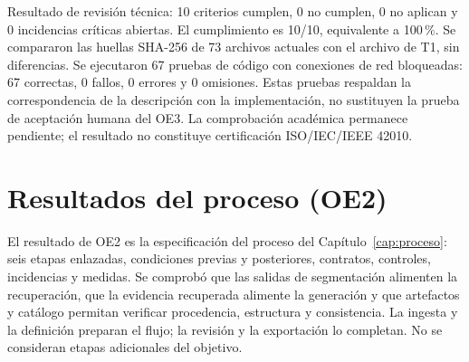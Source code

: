 Resultado de revisión técnica: 10 criterios cumplen, 0 no cumplen, 0 no aplican y 0 incidencias críticas abiertas. El cumplimiento es 10/10, equivalente a 100\,\%. Se compararon las huellas SHA-256 de 73 archivos actuales con el archivo de T1, sin diferencias. Se ejecutaron 67 pruebas de código con conexiones de red bloqueadas: 67 correctas, 0 fallos, 0 errores y 0 omisiones. Estas pruebas respaldan la correspondencia de la descripción con la implementación, no sustituyen la prueba de aceptación humana del OE3. La comprobación académica permanece pendiente; el resultado no constituye certificación ISO/IEC/IEEE 42010.

\section{Resultados del proceso (OE2)}

El resultado de OE2 es la especificación del proceso del Capítulo~\ref{cap:proceso}: seis etapas enlazadas, condiciones previas y posteriores, contratos, controles, incidencias y medidas. Se comprobó que las salidas de segmentación alimenten la recuperación, que la evidencia recuperada alimente la generación y que artefactos y catálogo permitan verificar procedencia, estructura y consistencia. La ingesta y la definición preparan el flujo; la revisión y la exportación lo completan. No se consideran etapas adicionales del objetivo.

